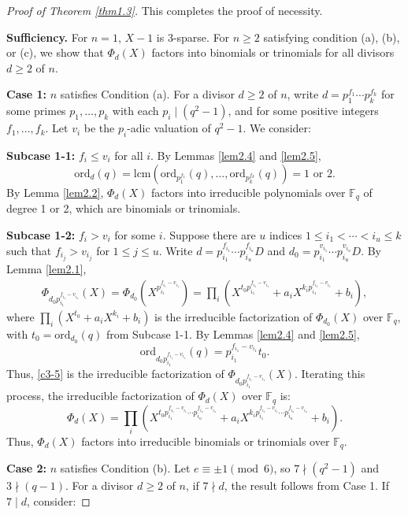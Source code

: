 \documentclass[10pt,reqno]{amsart}
\theoremstyle{definition}
\theoremstyle{remark}
\numberwithin{equation}{section}
\newcommand{\lcm}{\mbox{lcm}}
\begin{document}
\begin{proof}[Proof of Theorem \ref{thm1.3}]
This completes the proof of necessity.

\textbf{Sufficiency.} For $n = 1$, $X - 1$ is 3-sparse. For $n \geq 2$ satisfying condition (a), (b), or (c), we show that $\Phi_d(X)$ factors into binomials or trinomials for all divisors $d \geq 2$ of $n$.

\textbf{Case 1: }$n$ satisfies Condition (a). For a divisor $d \geq 2$ of $n$, write $d = p_1^{f_1} \cdots p_k^{f_k}$ for some primes $p_1, \ldots, p_k$ with each $p_i\mid (q^2-1)$, and for some positive integers $f_1, \ldots, f_k$. Let $v_i$ be the $p_i$-adic valuation of $q^2 - 1$. We consider:

\textbf{Subcase 1-1:} $f_i \leq v_i$ for all $i$. By Lemmas \ref{lem2.4} and \ref{lem2.5},
\[
\text{ord}_d(q) = \lcm(\text{ord}_{p_1^{f_1}}(q), \ldots, \text{ord}_{p_k^{f_k}}(q)) = 1 \text{ or } 2.
\]
By Lemma \ref{lem2.2}, $\Phi_d(X)$ factors into irreducible polynomials over $\mathbb{F}_q$ of degree 1 or 2, which are binomials or trinomials.

\textbf{Subcase 1-2:} $f_i > v_i$ for some $i$. Suppose there are $u$ indices $1 \leq i_1 < \cdots < i_u \leq k$ such that $f_{i_j} > v_{i_j}$ for $1 \leq j \leq u$. Write $d = p_{i_1}^{f_{i_1}} \cdots p_{i_u}^{f_{i_u}} D$ and $d_0 = p_{i_1}^{v_{i_1}} \cdots p_{i_u}^{v_{i_u}} D$. By Lemma \ref{lem2.1},
\begin{align}\label{c3-5}
\Phi_{d_0 p_{i_1}^{f_{i_1} - v_{i_1}}}(X) = \Phi_{d_0}(X^{p_{i_1}^{f_{i_1} - v_{i_1}}}) = \prod_i (X^{t_0 p_{i_1}^{f_{i_1} - v_{i_1}}} + a_i X^{k_i p_{i_1}^{f_{i_1} - v_{i_1}}} + b_i),
\end{align}
where $\prod_i (X^{t_0} + a_i X^{k_i} + b_i)$ is the irreducible factorization of $\Phi_{d_0}(X)$ over $\mathbb{F}_q$, with $t_0 = \text{ord}_{d_0}(q)$ from Subcase 1-1. By Lemmas \ref{lem2.4} and \ref{lem2.5},
\[
\text{ord}_{d_0 p_{i_1}^{f_{i_1} - v_{i_1}}}(q) = p_{i_1}^{f_{i_1} - v_{i_1}} t_0.
\]
Thus, \eqref{c3-5} is the irreducible factorization of $\Phi_{d_0 p_{i_1}^{f_{i_1} - v_{i_1}}}(X)$. Iterating this process, the irreducible factorization of $\Phi_d(X)$ over $\mathbb{F}_q$ is:
\[
\Phi_d(X) = \prod_i (X^{t_0 p_{i_1}^{f_{i_1} - v_{i_1}} \cdots p_{i_u}^{f_{i_u} - v_{i_u}}} + a_i X^{k_i p_{i_1}^{f_{i_1} - v_{i_1}} \cdots p_{i_u}^{f_{i_u} - v_{i_u}}} + b_i).
\]
Thus, $\Phi_d(X)$ factors into irreducible binomials or trinomials over $\mathbb{F}_q$.

\textbf{Case 2:} $n$ satisfies Condition (b). Let $e\equiv \pm 1 \pmod{6}$, so $7 \nmid (q^2 - 1)$ and $3\nmid (q-1)$. For a divisor $d \geq 2$ of $n$, if $7 \nmid d$, the result follows from Case 1. If $7 \mid d$, consider:


\end{proof}
\end{document}
